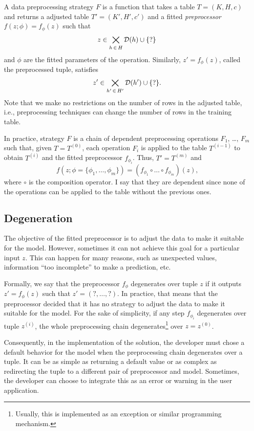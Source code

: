A data preprocessing strategy $F$ is a function that takes a table $T = (K, H, c)$ and
returns a adjusted table $T' = (K', H', c')$ and a fitted \emph{preprocessor} $f(z; \phi)
= f_\phi(z)$ such that $$z \in \bigtimes_{h\, \in\, H} \mathcal{D}\!\left(h\right) \cup \{?\}$$ and $\phi$ are
the fitted parameters of the operation.  Similarly, $z' = f_\phi(z)$, called the
preprocessed tuple, satisfies $$z' \in \bigtimes_{h'\, \in\, H'} \mathcal{D}\!\left(h'\right) \cup
\{?\}\text{.}$$ Note that we make no restrictions on the number of rows in the adjusted
table, i.e., preprocessing techniques can change the number of rows in the training table.

In practice, strategy $F$ is a chain of dependent preprocessing operations $F_1$, \dots,
$F_m$ such that, given $T = T^{(0)}$, each operation $F_i$ is applied to the table
$T^{(i-1)}$ to obtain $T^{(i)}$ and the fitted preprocessor $f_{\phi_i}$.  Thus, $T' =
T^{(m)}$ and $$f(z; \phi = \{\phi_1, \dots, \phi_m\}) = \left(f_{\phi_1} \circ \dots \circ
f_{\phi_m}\right)(z)\text{,}$$ where $\circ$ is the composition operator.  I say that
they are dependent since none of the operations can be applied to the table without the
previous ones.

\subsection{Degeneration}

The objective of the fitted preprocessor is to adjust the data to make it suitable for the
model.  However, sometimes it can not achieve this goal for a particular input $z$.  This
can happen for many reasons, such as unexpected values, information ``too incomplete'' to
make a prediction, etc.

Formally, we say that the preprocessor $f_\phi$ degenerates over tuple $z$ if it outputs
$z' = f_\phi(z)$ such that $z' = (?, \dots, ?)$.  In practice, that means that the
preprocessor decided that it has no strategy to adjust the data to make it suitable for
the model.  For the sake of simplicity, if any step $f_{\phi_i}$ degenerates over
tuple $z^{(i)}$, the whole preprocessing chain degenerates\footnote{Usually, this is
implemented as an exception or similar programming mechanism.} over $z = z^{(0)}$.

Consequently, in the implementation of the solution, the developer must chose a default
behavior for the model when the preprocessing chain degenerates over a tuple.  It can
be as simple as returning a default value or as complex as redirecting the tuple to a
different pair of preprocessor and model.  Sometimes, the developer can choose to
integrate this as an error or warning in the user application.

